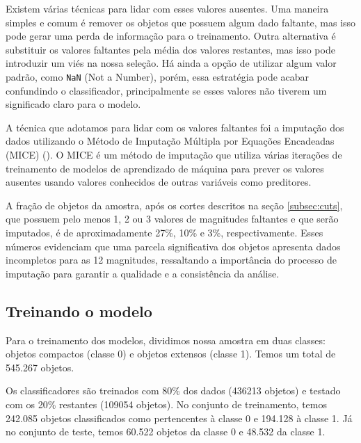 
Existem várias técnicas para lidar com esses valores ausentes. Uma maneira simples e comum é remover os objetos que possuem algum dado faltante, mas isso pode gerar uma perda de informação para o treinamento. Outra alternativa é substituir os valores faltantes pela média dos valores restantes, mas isso pode introduzir um viés na nossa seleção. Há ainda a opção de utilizar algum valor padrão, como \texttt{NaN} (Not a Number), porém, essa estratégia pode acabar confundindo o classificador, principalmente se esses valores não tiverem um significado claro para o modelo.

A técnica que adotamos para lidar com os valores faltantes foi a imputação dos dados utilizando o Método de Imputação Múltipla por Equações Encadeadas (MICE) (\citealp{MICE}). O MICE é um método de imputação que utiliza várias iterações de treinamento de modelos de aprendizado de máquina para prever os valores ausentes usando valores conhecidos de outras variáveis como preditores.

A fração de objetos da amostra, após os cortes descritos na seção \ref{subsec:cuts}, que possuem pelo menos 1, 2 ou 3 valores de magnitudes faltantes e que serão imputados, é de aproximadamente 27\%, 10\% e 3\%, respectivamente. Esses números evidenciam que uma parcela significativa dos objetos apresenta dados incompletos para as 12 magnitudes, ressaltando a importância do processo de imputação para garantir a qualidade e a consistência da análise.

\subsection{Treinando o modelo}\label{subsec:treinando_modelo}

Para o treinamento dos modelos, dividimos nossa amostra em duas classes: objetos compactos (classe 0) e objetos extensos (classe 1). Temos um total de 545.267 objetos.

Os classificadores são treinados com 80\% dos dados (436213 objetos) e testado com os 20\% restantes (109054 objetos).
No conjunto de treinamento, temos 242.085 objetos classificados como pertencentes à classe 0 e 194.128 à classe 1. Já no conjunto de teste, temos 60.522 objetos da classe 0 e 48.532 da classe 1.

